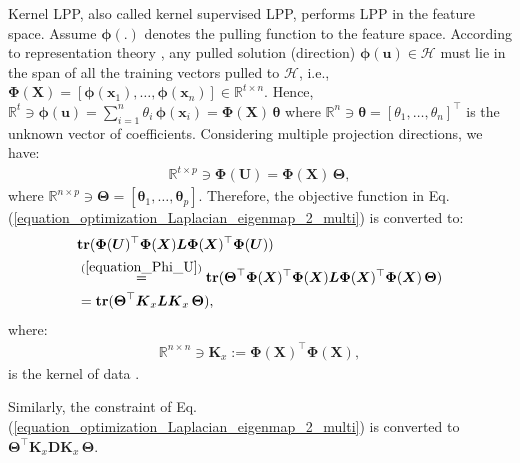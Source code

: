 \documentclass[lang=cn,10pt]{gorgeousnbook}
\numberwithin{equation}{section}%
\numberwithin{figure}{section}%
\begin{document}
Kernel LPP, also called kernel supervised LPP,  \cite{cheng2005supervised,li2008kernel} performs LPP in the feature space. 
Assume $\boldsymbol{\phi}(.)$ denotes the pulling function to the feature space. 
According to representation theory \cite{alperin1993local}, any pulled solution (direction) $\boldsymbol{\phi}(\boldsymbol{u}) \in \mathcal{H}$ must lie in the span of all the training vectors pulled to $\mathcal{H}$, i.e., $\boldsymbol{\Phi}(\boldsymbol{X}) = [\boldsymbol{\phi}(\boldsymbol{x}_1), \dots, \boldsymbol{\phi}(\boldsymbol{x}_n)] \in \mathbb{R}^{t\times n}$. 
Hence, $\mathbb{R}^{t} \ni \boldsymbol{\phi}(\boldsymbol{u}) = \sum_{i=1}^n \theta_i\, \boldsymbol{\phi}(\boldsymbol{x}_i) = \boldsymbol{\Phi}(\boldsymbol{X})\, \boldsymbol{\theta}$ where $\mathbb{R}^n \ni \boldsymbol{\theta} = [\theta_1, \dots, \theta_n]^\top$ is the unknown vector of coefficients.
Considering multiple projection directions, we have:
\begin{align}\label{equation_Phi_U}
\mathbb{R}^{t \times p} \ni \boldsymbol{\Phi}(\boldsymbol{U}) = \boldsymbol{\Phi}(\boldsymbol{X})\, \boldsymbol{\Theta},
\end{align}
where $\mathbb{R}^{n \times p} \ni \boldsymbol{\Theta} = [\boldsymbol{\theta}_1, \dots, \boldsymbol{\theta}_p]$.
Therefore, the objective function in Eq. (\ref{equation_optimization_Laplacian_eigenmap_2_multi}) is converted to:
\begin{align*}
& \textbf{tr}(\boldsymbol{\Phi}(\boldsymbol{U})^\top \boldsymbol{\Phi}(\boldsymbol{X}) \boldsymbol{L} \boldsymbol{\Phi}(\boldsymbol{X})^\top \boldsymbol{\Phi}(\boldsymbol{U})) \\
& \overset{(\ref{equation_Phi_U})}{=} \textbf{tr}(\boldsymbol{\Theta}^\top \boldsymbol{\Phi}(\boldsymbol{X})^\top \boldsymbol{\Phi}(\boldsymbol{X}) \boldsymbol{L} \boldsymbol{\Phi}(\boldsymbol{X})^\top \boldsymbol{\Phi}(\boldsymbol{X})\, \boldsymbol{\Theta}) \\
&= \textbf{tr}(\boldsymbol{\Theta}^\top \boldsymbol{K}_x \boldsymbol{L} \boldsymbol{K}_x\, \boldsymbol{\Theta}),
\end{align*}
where:
\begin{align}\label{equation_kernel_of_data}
\mathbb{R}^{n \times n} \ni \boldsymbol{K}_x := \boldsymbol{\Phi}(\boldsymbol{X})^\top \boldsymbol{\Phi}(\boldsymbol{X}),
\end{align}
is the kernel of data \cite{hofmann2008kernel}. 

Similarly, the constraint of Eq. (\ref{equation_optimization_Laplacian_eigenmap_2_multi}) is converted to $\boldsymbol{\Theta}^\top \boldsymbol{K}_x \boldsymbol{D} \boldsymbol{K}_x\, \boldsymbol{\Theta}$.
\end{document}
